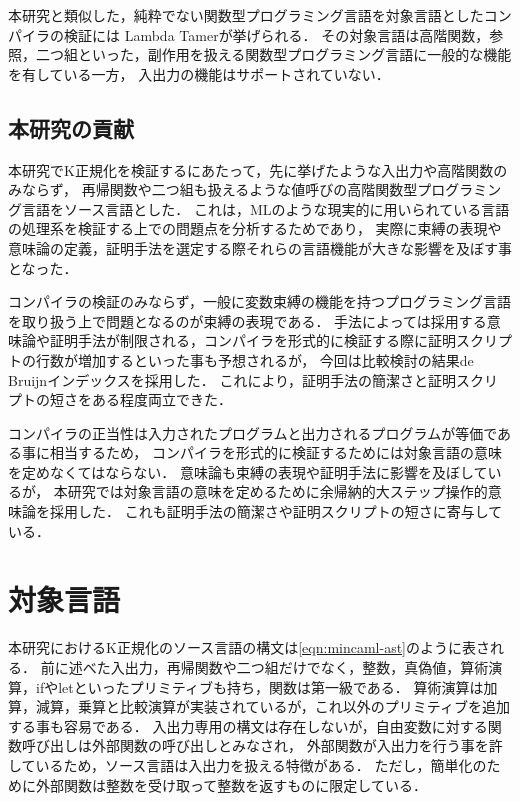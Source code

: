 \documentclass[T]{compsoft}
\begin{document}
本研究と類似した，純粋でない関数型プログラミング言語を対象言語としたコンパイラの検証には
Lambda Tamer\cite{ImpurePOPL10}が挙げられる．
その対象言語は高階関数，参照，二つ組といった，副作用を扱える関数型プログラミング言語に一般的な機能を有している一方，
入出力の機能はサポートされていない．

\subsection{本研究の貢献}
本研究でK正規化を検証するにあたって，先に挙げたような入出力や高階関数のみならず，
再帰関数や二つ組も扱えるような値呼びの高階関数型プログラミング言語をソース言語とした．
これは，MLのような現実的に用いられている言語の処理系を検証する上での問題点を分析するためであり，
実際に束縛の表現や意味論の定義，証明手法を選定する際それらの言語機能が大きな影響を及ぼす事となった．

コンパイラの検証のみならず，一般に変数束縛の機能を持つプログラミング言語を取り扱う上で問題となるのが束縛の表現である．
手法によっては採用する意味論や証明手法が制限される，コンパイラを形式的に検証する際に証明スクリプトの行数が増加するといった事も予想されるが，
今回は比較検討の結果de Bruijnインデックスを採用した．
これにより，証明手法の簡潔さと証明スクリプトの短さをある程度両立できた．

コンパイラの正当性は入力されたプログラムと出力されるプログラムが等価である事に相当するため，
コンパイラを形式的に検証するためには対象言語の意味を定めなくてはならない．
意味論も束縛の表現や証明手法に影響を及ぼしているが，
本研究では対象言語の意味を定めるために余帰納的大ステップ操作的意味論を採用した．
これも証明手法の簡潔さや証明スクリプトの短さに寄与している．

\section{対象言語}
本研究におけるK正規化のソース言語の構文は\figurename\ref{eqn:mincaml-ast}のように表される．
前に述べた入出力，再帰関数や二つ組だけでなく，整数，真偽値，算術演算，ifやletといったプリミティブも持ち，関数は第一級である．
算術演算は加算，減算，乗算と比較演算が実装されているが，これ以外のプリミティブを追加する事も容易である．
入出力専用の構文は存在しないが，自由変数に対する関数呼び出しは外部関数の呼び出しとみなされ，
外部関数が入出力を行う事を許しているため，ソース言語は入出力を扱える特徴がある．
ただし，簡単化のために外部関数は整数を受け取って整数を返すものに限定している．
\end{document}
